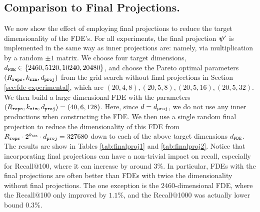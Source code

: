 \subsection{Comparison to Final Projections.} \label{app:finalproj}
We now show the effect of employing final projections to reduce the target dimensionality of the FDE's. For all experiments, the final projection $\boldsymbol{\psi}'$ is implemented in the same way as inner projections are: namely, via multiplication by a random $\pm 1$ matrix. 
We choose four target dimensions, $d_{\texttt{FDE}} \in \{2460,5120,10240,20480\}$, and choose the Pareto optimal parameters $(R_{\texttt{reps}}, k_{\texttt{sim}}, d_{\texttt{proj}})$ from the grid search without final projections in Section \ref{sec:fde-experimental}, which are $(20,4,8),(20,5,8),(20,5,16),(20,5,32)$. We then build a large dimensional FDE with the parameters $(R_{\texttt{reps}},k_{\texttt{sim}},d_{\texttt{proj}}) = (40,6,128)$. Here, since $d = d_{\texttt{proj}}$, we do not use any inner productions when constructing the FDE. We then use a single random final projection to reduce the dimensionality of this FDE from $R_{\texttt{reps}} \cdot 2^{k_{\texttt{sim}}} \cdot d_{\texttt{proj}} = 327680$ down to each of the above target dimensions $d_{\texttt{FDE}}$. The results are show in Tables \ref{tab:finalproj1} and \ref{tab:finalproj2}. Notice that incorporating final projections can have a non-trivial impact on recall, especially for Recall$@$100, where it can increase by around $3\%$. In particular, FDEs with the final projections are often better than FDEs with twice the dimensionality without final projections. The one exception is the  $2460$-dimensional FDE, where the Recall$@$100 only improved by $1.1\%$, and the Recall$@$1000 was actually lower bound $0.3\%$.

